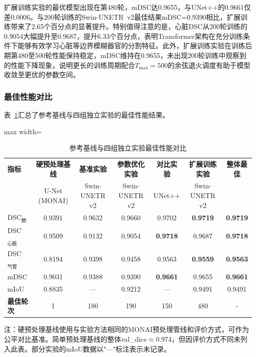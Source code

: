 \documentclass[12pt, a4paper]{article}
\begin{document}
扩展训练实验的最优模型出现在第480轮，mDSC达0.9655，与UNet++的0.9661仅差0.0006。与200轮训练的Swin-UNETR~v2最佳结果mDSC=0.9390相比，扩展训练带来了2.65个百分点的显著提升。特别值得注意的是，心脏DSC从200轮训练的0.9054大幅提升至0.9687，提升6.33个百分点，表明Transformer架构在充分训练条件下能够有效学习心脏等边界模糊器官的分割特征。此外，扩展训练实验在训练后期第480至500轮性能保持稳定，mDSC维持在0.9655，未出现200轮训练中观察到的性能下降现象，说明更长的训练周期配合$T_{\max}=500$的余弦退火调度有助于模型收敛至更优的参数空间。

\subsubsection{最佳性能对比}

表~\ref{tab:best_results}汇总了参考基线与四组独立实验的最佳性能结果。

\begin{table}[H]
    \centering
    \caption{参考基线与四组独立实验最佳性能对比}
    \label{tab:best_results}
    \begin{adjustbox}{max width=\textwidth}
    \begin{tabular}{@{}lcccccc@{}}
        \toprule
        \textbf{指标} & \textbf{硬预处理基线} & \textbf{基准实验} & \textbf{参数优化实验} & \textbf{对比实验} & \textbf{扩展训练实验} & \textbf{整体最佳} \\
        & U-Net (MONAI) & Swin-UNETR v2 & Swin-UNETR v2 & UNet++ & Swin-UNETR v2 & \\
        \midrule
        DSC$_\text{肺}$ & 0.9391 & 0.9632 & 0.9660 & 0.9702 & \textbf{0.9719} & \textbf{0.9719} \\
        DSC$_\text{心脏}$ & 0.9509 & 0.9132 & 0.9054 & \textbf{0.9718} & 0.9687 & \textbf{0.9718} \\
        DSC$_\text{气管}$ & 0.8194 & 0.9398 & 0.9458 & 0.9563 & \textbf{0.9559} & \textbf{0.9563} \\
        mDSC & 0.9031 & 0.9388 & 0.9390 & \textbf{0.9661} & 0.9655 & \textbf{0.9661} \\
        mIoU & 0.8835 & --- & 0.9212 & --- & 0.9491 & 0.9491 \\
        \textbf{最佳轮次} & 1 & 180 & 190 & 150 & 480 & - \\
        \bottomrule
    \end{tabular}
    \end{adjustbox}
\end{table}

注：硬预处理基线使用与实验方法相同的MONAI预处理管线和评价方式，可作为公平对比基准。简单预处理基线的整体val\_dice$\approx$0.974，但因评价方式不同未列入此表。部分实验的mIoU数据以"---"标注表示未记录。
\end{document}

